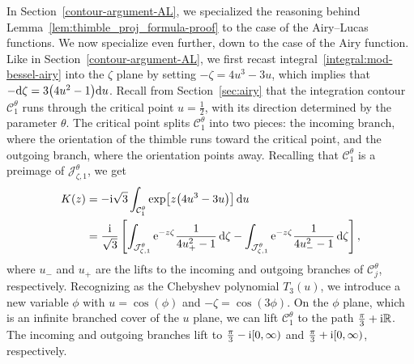 \documentclass[10pt,a4paper]{amsart}
\newcommand{\R}{\mathbb{R}}
\numberwithin{equation}{section}
\begin{document}
In Section~\ref{contour-argument-AL}, we specialized the reasoning behind Lemma~\ref{lem:thimble_proj_formula-proof} to the case of the Airy--Lucas functions. We now specialize even further, down to the case of the Airy function. Like in Section~\ref{contour-argument-AL}, we first recast integral~\eqref{integral:mod-bessel-airy} into the $\zeta$ plane by setting $-\zeta = 4u^3 - 3u$, which implies that $-{\rm d}\zeta = 3\bigl(4u^2 - 1\bigr){\rm d}u$. Recall from Section~\ref{sec:airy} that the integration contour $\mathcal{C}^\theta_1$ runs through the critical point $u = \frac{1}{2}$, with its direction determined by the parameter $\theta$. The critical point splits $\mathcal{C}^\theta_1$ into two pieces: the incoming branch, where the orientation of the thimble runs toward the critical point, and the outgoing branch, where the orientation points away. Recalling that $\mathcal{C}^\theta_1$ is a preimage of $\mathcal{J}^\theta_{\zeta,1}$, we get
\begin{align*}
K(z) & = -{\rm i}\sqrt{3} \int_{\mathcal{C}^\theta_1} \exp\bigl[z \bigl(4u^3 - 3u\bigr)\bigr] \, {\rm d}u \\
& = \frac{{\rm i}}{\sqrt{3}} \left[ \int_{\mathcal{J}^\theta_{\zeta, 1}} {\rm e}^{-z\zeta} \frac{1}{4u_+^2 - 1} \,{\rm d}\zeta - \int_{\mathcal{J}^\theta_{\zeta, 1}} {\rm e}^{-z\zeta} \frac{1}{4u_-^2 - 1} \, {\rm d}\zeta \right],
\end{align*}
where $u_-$ and $u_+$ are the lifts to the incoming and outgoing branches of $\mathcal{C}^\theta_j$, respectively. Recognizing  as the Chebyshev polynomial $T_3(u)$, we introduce a new variable $\phi$ with $u = \cos(\phi)$ and $-\zeta = \cos(3\phi)$. On the $\phi$ plane, which is an infinite branched cover of the $u$ plane, we can lift $\mathcal{C}^\theta_1$ to the path $\frac{\pi}{3} + {\rm i}\R$. The incoming and outgoing branches lift to $\frac{\pi}{3} - {\rm i}[0, \infty)$ and $\frac{\pi}{3} + {\rm i}[0, \infty)$, respectively.
\end{document}
